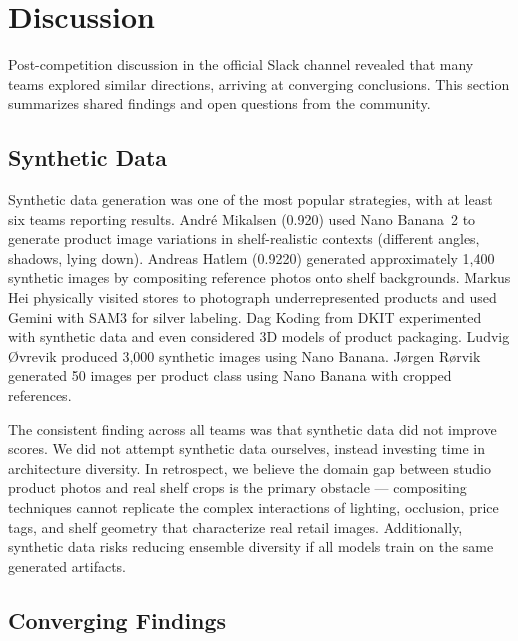 \documentclass[11pt,a4paper]{article}
\begin{document}
\section{Discussion}
\label{sec:community}

Post-competition discussion in the official Slack channel revealed that many teams explored similar directions, arriving at converging conclusions.
This section summarizes shared findings and open questions from the community.

\subsection{Synthetic Data}

Synthetic data generation was one of the most popular strategies, with at least six teams reporting results.
Andr\'e Mikalsen (0.920) used Nano Banana~2 to generate product image variations in shelf-realistic contexts (different angles, shadows, lying down).
Andreas Hatlem (0.9220) generated approximately 1,400 synthetic images by compositing reference photos onto shelf backgrounds.
Markus Hei physically visited stores to photograph underrepresented products and used Gemini with SAM3 for silver labeling.
Dag Koding from DKIT experimented with synthetic data and even considered 3D models of product packaging.
Ludvig {\O}vrevik produced 3,000 synthetic images using Nano Banana.
J{\o}rgen R{\o}rvik generated 50 images per product class using Nano Banana with cropped references.

The consistent finding across all teams was that synthetic data did not improve scores.
We did not attempt synthetic data ourselves, instead investing time in architecture diversity.
In retrospect, we believe the domain gap between studio product photos and real shelf crops is the primary obstacle --- compositing techniques cannot replicate the complex interactions of lighting, occlusion, price tags, and shelf geometry that characterize real retail images.
Additionally, synthetic data risks reducing ensemble diversity if all models train on the same generated artifacts.

\subsection{Converging Findings}
\end{document}
